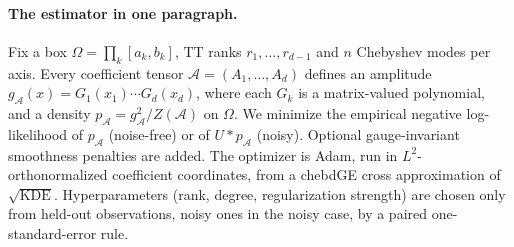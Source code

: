\documentclass[11pt]{article}
\theoremstyle{definition}
\theoremstyle{remark}
\begin{document}
\paragraph{The estimator in one paragraph.}
Fix a box $\Omega=\prod_k[a_k,b_k]$, TT ranks $r_1,\dots,r_{d-1}$ and $n$ Chebyshev modes per axis. Every
coefficient tensor $\mathcal A=(A_1,\dots,A_d)$ defines an amplitude $g_{\mathcal A}(x)=G_1(x_1)\cdots G_d(x_d)$,
where each $G_k$ is a matrix-valued polynomial, and a density $p_{\mathcal A}=g_{\mathcal A}^2/Z(\mathcal A)$ on $\Omega$. We minimize
the empirical negative log-likelihood of $p_{\mathcal A}$ (noise-free) or of $U*p_{\mathcal A}$ (noisy). Optional
gauge-invariant smoothness penalties are added. The optimizer is Adam, run in $L^2$-orthonormalized coefficient
coordinates, from a chebdGE cross approximation of $\sqrt{\mathrm{KDE}}$. Hyperparameters (rank, degree,
regularization strength) are chosen only from held-out observations, noisy ones in the noisy case, by a paired
one-standard-error rule.
\end{document}
